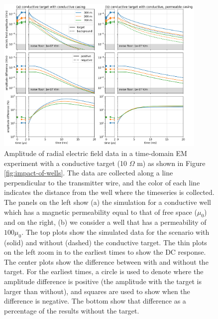 \begin{figure}[!htb]
    \begin{center}
    \includegraphics[width=0.9\textwidth]{figures/impact-of-wells-em-data.png}
    \end{center}
\caption{
    Amplitude of radial electric field data in a time-domain EM experiment with a conductive target (10 $\Omega$ m) as shown in Figure \ref{fig:impact-of-wells}.
    The data are collected along a line perpendicular to the transmitter wire, and the color of each line indicates the distance from the well where the timeseries is collected.
    The panels on the left show (a) the simulation for a conductive well which has a magnetic permeability equal to that of free space ($\mu_0$) and on the right, (b) we consider a well that has a permeability of $100 \mu_0$.
    The top plots show the simulated data for the scenario with (solid) and without (dashed) the conductive target. The thin plots on the left zoom in to the earliest times to show the DC response.
    The center plots show the difference between with and without the target. For the earliest times, a circle is used to denote where the amplitude difference is positive (the amplitude with the target is larger than without), and squares are used to show when the difference is negative. The bottom show that difference as a percentage of the results without the target.
}
\label{fig:impact-of-wells-em-data}
\end{figure}
